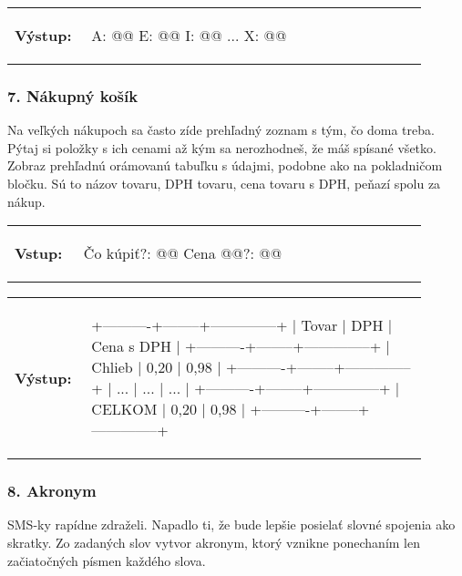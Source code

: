 \vspace{-2em}
\begin{tabular}{@{}p{0.15\linewidth}p{0.75\linewidth}}
\textbf{\small Výstup:} &
\vspace{-3em}
\begin{code}
A: @\fbox{****}@
E: @\fbox{*******}@
I: @\fbox{****}@
...
X: @\fbox{*}@
\end{code}
\end{tabular}
\vspace{-2em}


\subsubsection*{7. Nákupný košík}
Na veľkých nákupoch sa často zíde prehľadný zoznam s tým, čo doma treba. Pýtaj si položky s ich cenami až kým sa nerozhodneš, že máš spísané všetko. Zobraz prehľadnú orámovanú tabuľku s údajmi, podobne ako na pokladničom bločku. Sú to názov tovaru, DPH tovaru, cena tovaru s DPH, peňazí spolu za nákup.

\begin{tabular}{@{}p{0.15\linewidth}p{0.75\linewidth}}
\textbf{\small Vstup:} &
\vspace{-3em}
\begin{code}
Čo kúpiť?: @\fbox{\phantom{vstup}}@
Cena @\fbox{\phantom{vstup}}@?: @\fbox{\phantom{vstup}}@
\end{code}
\end{tabular}

\vspace{-2em}
\begin{tabular}{@{}p{0.15\linewidth}p{0.75\linewidth}}
\textbf{\small Výstup:} &
\vspace{-3em}
\begin{code}
+----------+--------+--------------+
| Tovar    |  DPH   |  Cena s DPH  |
+----------+--------+--------------+
| Chlieb   |  0,20  |      0,98    |
+----------+--------+--------------+
|    ...   |  ...   |     ...      |
+----------+--------+--------------+
| CELKOM   |  0,20  |      0,98    |
+----------+--------+--------------+
\end{code}
\end{tabular}
\vspace{-2em}

\subsubsection*{8. Akronym}
SMS-ky rapídne zdraželi. Napadlo ti, že bude lepšie posielať slovné spojenia ako skratky. Zo zadaných slov vytvor akronym, ktorý vznikne ponechaním len začiatočných písmen každého slova.

